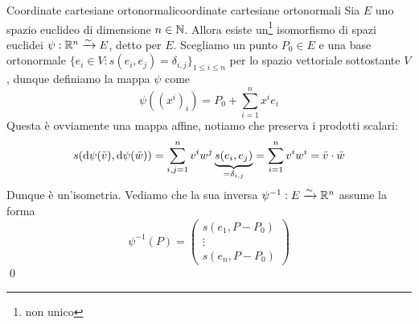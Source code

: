 \documentclass[openany]{book}
\begin{document}
\begin{proposition}{Coordinate cartesiane ortonormali}{coordinate cartesiane ortonormali}
    Sia $E$ uno spazio euclideo di dimensione $n \in \mathbb{N}$. Allora esiste un\footnote{non unico} isomorfismo di spazi euclidei $\psi:\mathbb{R}^n\xrightarrow{\sim} E$, detto  per $E$.
    \proof 
    Scegliamo un punto $P_0 \in E$ e una base ortonormale $\{e_i \in V : s(e_i,e_j) = \delta_{i,j}\}_{1\le i\le n}$ per lo spazio vettoriale sottostante $V$, dunque definiamo la mappa $\psi$ come
    \[\psi( (x^i)_i ) = P_0 + \sum_{i=1}^n x^ie_i \]
    Questa è ovviamente una mappa affine, notiamo che preserva i prodotti scalari:
    \[ s(\text{d} \psi(\bar{v}),\text{d}\psi(\bar{w}) ) = \sum_{i,j = 1}^n v^i w^j \underbrace{s(e_i,e_j)}_{=\delta_{i,j}} = \sum_{i=1}^n v^i w^i = \bar{v}\cdot\bar{w}\]
    Dunque è un'isometria. Vediamo che la sua inversa $\psi^{-1}:E\xrightarrow{\sim}\mathbb{R}^n$ assume la forma 
    \[ \psi^{-1}(P) = \begin{pmatrix}s(e_1,P-P_0) \\ \vdots \\ s(e_n, P-P_0) \end{pmatrix} \]
    \qed
\end{proposition}
\end{document}
